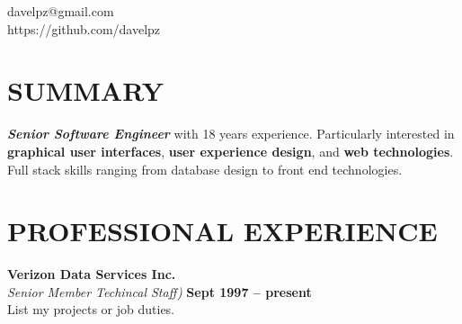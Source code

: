 \documentclass[margin,line]{resume}
\begin{document}
{
    \hfill davelpz@gmail.com           \vspace{0mm}\\\vspace{0mm}%
    \hfill https://github.com/davelpz \vspace{0mm}\\\vspace{-9mm}%
}

\begin{resume}

    \vspace{-3mm}

    \section{\mysidestyle \textbf{\large{S}\small{UMMARY}}}

    \textbf{\textsl{Senior Software Engineer}} with 18 years experience.  Particularly interested in \textbf{graphical user interfaces}, \textbf{user experience design}, and \textbf{web technologies}.  Full stack skills ranging from database design to front end technologies.

    \vspace{-1mm}

\sectionline

    \section{\mysidestyle \textbf{\large{P}\small{ROFESSIONAL} \large{E}\small{XPERIENCE}}}

    \textbf{\listing Verizon Data Services Inc.} \vspace{2mm}\\\vspace{1mm}%
    \textsl{Senior Member Techincal Staff)} \hfill \textbf{Sept 1997 -- present}\\
    List my projects or job duties.


\end{resume}
\end{document}

